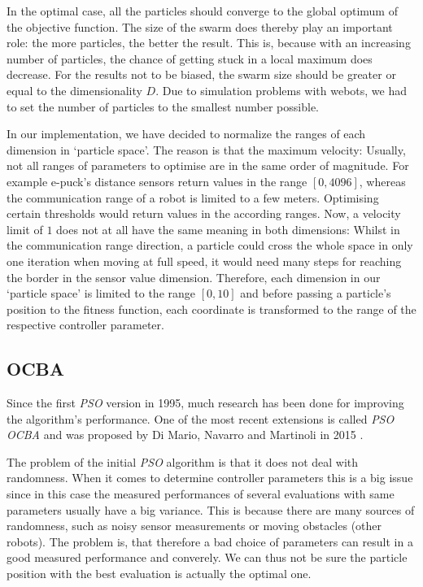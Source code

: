 \documentclass[journal]{IEEEtran}
\begin{document}
In the optimal case, all the particles should converge to the global optimum of the objective 
function. The size of the swarm does thereby play an important role: the more particles, the 
better the result. This is, because with an increasing number of particles, the chance of 
getting stuck in a local maximum does decrease. For the results not to be biased, the swarm 
size should be greater or equal to the dimensionality $D$. Due to simulation problems with 
webots\textregistered, we had to set the number of particles to the smallest number possible. 

In our implementation, we have decided to normalize the ranges of each dimension in `particle 
space'. The reason is that the maximum velocity: Usually, not all ranges of parameters to 
optimise are in the same order of magnitude. For example e-puck's distance sensors return 
values in the range $[0,4096]$, whereas the communication range of a robot is limited to a few 
meters. Optimising certain thresholds would return values in the according ranges. Now, a 
velocity limit of $1$ does not at all have the same meaning in both dimensions: Whilst in the 
communication range direction, a particle could cross the whole space in only one iteration 
when moving at full speed, it would need many steps for reaching the border in the sensor 
value dimension. Therefore, each dimension in our `particle space' is limited to the range 
$[0, 10]$ and before passing a particle's position to the fitness function, each coordinate is 
transformed to the range of the respective controller parameter.

\subsection{OCBA}
Since the first \textit{PSO} version in 1995, much research has been done for improving the algorithm's performance. One of the most recent extensions is called \textit{PSO OCBA} and was proposed by Di Mario, Navarro and Martinoli in 2015 \cite{IEEEhowto:martinoli_pso_noise_2}. 

The problem of the initial \textit{PSO} algorithm is that it does not deal with randomness. When it comes to determine controller parameters this is a big issue since in this case the measured performances of several evaluations with same parameters usually have a big variance. This is because there are many sources of randomness, such as noisy sensor measurements or moving obstacles (other robots). The problem is, that therefore a bad choice of parameters can result in a good measured performance and converely. We can thus not be sure the particle position with the best evaluation is actually the optimal one.
\end{document}
